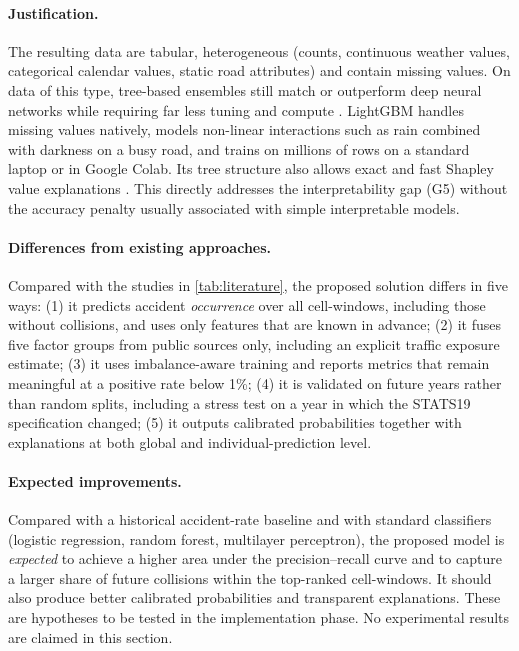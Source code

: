 \paragraph{Justification.}
The resulting data are tabular, heterogeneous (counts, continuous weather values, categorical calendar values, static road attributes) and contain missing values. On data of this type, tree-based ensembles still match or outperform deep neural networks while requiring far less tuning and compute \cite{grinsztajn2022tree}. LightGBM handles missing values natively, models non-linear interactions such as rain combined with darkness on a busy road, and trains on millions of rows on a standard laptop or in Google Colab. Its tree structure also allows exact and fast Shapley value explanations \cite{lundberg2020local}. This directly addresses the interpretability gap (G5) without the accuracy penalty usually associated with simple interpretable models.

\paragraph{Differences from existing approaches.}
Compared with the studies in \cref{tab:literature}, the proposed solution differs in five ways:
(1) it predicts accident \emph{occurrence} over all cell-windows, including those without collisions, and uses only features that are known in advance;
(2) it fuses five factor groups from public sources only, including an explicit traffic exposure estimate;
(3) it uses imbalance-aware training and reports metrics that remain meaningful at a positive rate below 1\%;
(4) it is validated on future years rather than random splits, including a stress test on a year in which the STATS19 specification changed;
(5) it outputs calibrated probabilities together with explanations at both global and individual-prediction level.

\paragraph{Expected improvements.}
Compared with a historical accident-rate baseline and with standard classifiers (logistic regression, random forest, multilayer perceptron), the proposed model is \emph{expected} to achieve a higher area under the precision--recall curve and to capture a larger share of future collisions within the top-ranked cell-windows. It should also produce better calibrated probabilities and transparent explanations. These are hypotheses to be tested in the implementation phase. No experimental results are claimed in this section.

